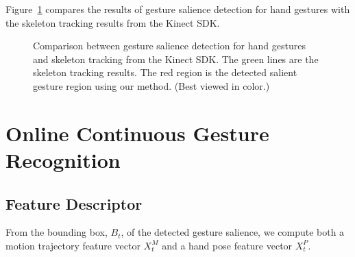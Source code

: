 \documentclass{sigchi}
\begin{document}
Figure~\ref{fig:compare-skeleton} compares the results of gesture salience detection for hand gestures with the skeleton tracking results
from the Kinect SDK.
\begin{figure}
\centering
{}
\caption{Comparison between gesture salience detection for hand gestures and skeleton tracking from the Kinect SDK. The green lines are
the skeleton tracking results. The red region is the detected salient gesture
region using our method. (Best viewed in color.)}
\label{fig:compare-skeleton}
\end{figure}

\section{Online Continuous Gesture Recognition}
\subsection{Feature Descriptor}
From the bounding box, $B_t$, of the detected gesture salience, we compute both
a motion trajectory feature vector $X_t^M$ and a hand pose feature vector $X_t^P$. 
\end{document}
